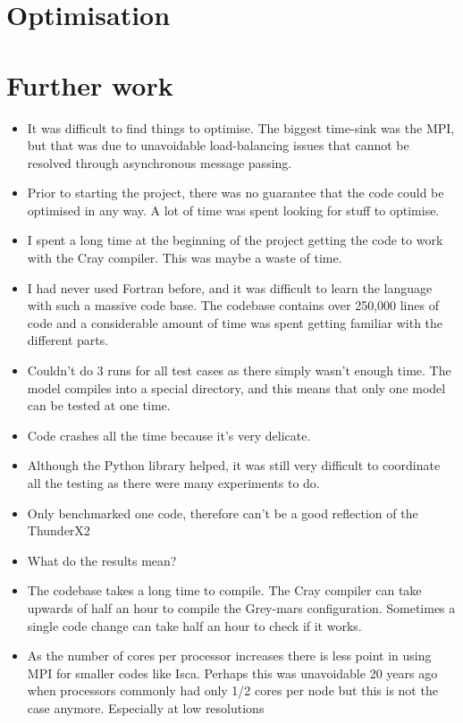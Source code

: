 \documentclass[a4paper,11pt]{report}
\begin{document}
\section{Optimisation}

\section{Further work}


\begin{itemize}
	\item It was difficult to find things to optimise. The biggest time-sink was the MPI, but that was due to unavoidable load-balancing issues that cannot be resolved through asynchronous message passing. 
	\item Prior to starting the project, there was no guarantee that the code could be optimised in any way. A lot of time was spent looking for stuff to optimise. 
	\item I spent a long time at the beginning of the project getting the code to work with the Cray compiler. This was maybe a waste of time. 
	\item I had never used Fortran before, and it was difficult to learn the language with such a massive code base. The codebase contains over 250,000 lines of code and a considerable amount of time was spent getting familiar with the different parts. 
	\item Couldn't do 3 runs for all test cases as there simply wasn't enough time. The model compiles into a special directory, and this means that only one model can be tested at one time. 
	\item Code crashes all the time because it's very delicate. 
	\item Although the Python library helped, it was still very difficult to coordinate all the testing as there were many experiments to do.
	\item Only benchmarked one code, therefore can't be a good reflection of the ThunderX2
	\item What do the results mean? 
	\item The codebase takes a long time to compile. The Cray compiler can take upwards of half an hour to compile the Grey-mars configuration. Sometimes a single code change can take half an hour to check if it works. 
	\item As the number of cores per processor increases there is less point in using MPI for smaller codes like Isca. Perhaps this was unavoidable 20 years ago when processors commonly had only 1/2 cores per node but this is not the case anymore. Especially at low resolutions
\end{itemize}
\end{document}
